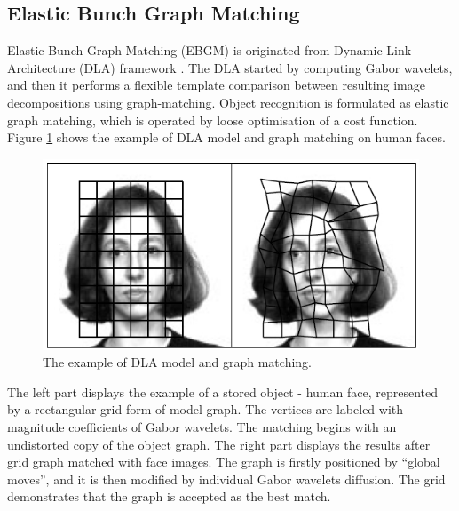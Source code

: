 \subsection{Elastic Bunch Graph Matching}
Elastic Bunch Graph Matching (EBGM) is originated from Dynamic Link Architecture (DLA) framework \cite{Lades1993}. The DLA started by computing Gabor wavelets, and then it performs a flexible template comparison between resulting image decompositions using graph-matching. Object recognition is formulated as elastic graph matching, which is operated by loose optimisation of a cost function. \mbox{Figure} \ref{fig:DLA} shows the example of DLA model and graph matching on human faces.
\begin{figure}[ht]
 \begin{center}
  \includegraphics[width=0.77\columnwidth]{ch2/figures/DLAmodel.jpg}
  \caption{The example of DLA model and graph matching.\cite{Lades1993}}
  \label{fig:DLA}
 \end{center}
\end{figure} 
The left part displays the example of a stored object - human face, represented by a rectangular grid form of model graph. The vertices are labeled with magnitude coefficients of Gabor wavelets. The matching begins with an undistorted copy of the object graph. The right part displays the results after grid graph matched with face images. The graph is firstly positioned by ``global moves'', and it is then modified by individual Gabor wavelets diffusion. The grid demonstrates that the graph is accepted as the best match.

